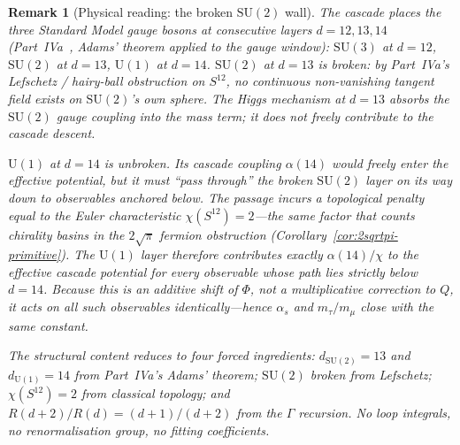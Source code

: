 \documentclass[12pt,a4paper]{article}
\newtheorem*{remark}{Remark}
\begin{document}
\begin{remark}[Physical reading: the broken $\mathrm{SU}(2)$ wall]\label{rem:als-closure-structural}
The cascade places the three Standard Model gauge bosons at consecutive layers $d=12,13,14$ (Part~IVa~\cite{part4a}, Adams' theorem applied to the gauge window): $\mathrm{SU}(3)$ at $d=12$, $\mathrm{SU}(2)$ at $d=13$, $\mathrm{U}(1)$ at $d=14$. $\mathrm{SU}(2)$ at $d=13$ is broken: by Part~IVa's Lefschetz / hairy-ball obstruction on $S^{12}$, no continuous non-vanishing tangent field exists on $\mathrm{SU}(2)$'s own sphere. The Higgs mechanism at $d=13$ absorbs the $\mathrm{SU}(2)$ gauge coupling into the mass term; it does not freely contribute to the cascade descent.

$\mathrm{U}(1)$ at $d=14$ is unbroken. Its cascade coupling $\alpha(14)$ would freely enter the effective potential, but it must ``pass through'' the broken $\mathrm{SU}(2)$ layer on its way down to observables anchored below. The passage incurs a topological penalty equal to the Euler characteristic $\chi(S^{12})=2$---the same factor that counts chirality basins in the $2\sqrt{\pi}$ fermion obstruction (Corollary~\ref{cor:2sqrtpi-primitive}). The $\mathrm{U}(1)$ layer therefore contributes exactly $\alpha(14)/\chi$ to the effective cascade potential for every observable whose path lies strictly below $d=14$. Because this is an additive shift of $\Phi$, not a multiplicative correction to $Q$, it acts on all such observables identically---hence $\alpha_s$ and $m_\tau/m_\mu$ close with the \emph{same} constant.

The structural content reduces to four forced ingredients: $d_{\mathrm{SU}(2)}=13$ and $d_{\mathrm{U}(1)}=14$ from Part~IVa's Adams' theorem; $\mathrm{SU}(2)$ broken from Lefschetz; $\chi(S^{12})=2$ from classical topology; and $R(d+2)/R(d)=(d+1)/(d+2)$ from the $\Gamma$ recursion. No loop integrals, no renormalisation group, no fitting coefficients.


\end{remark}
\end{document}
